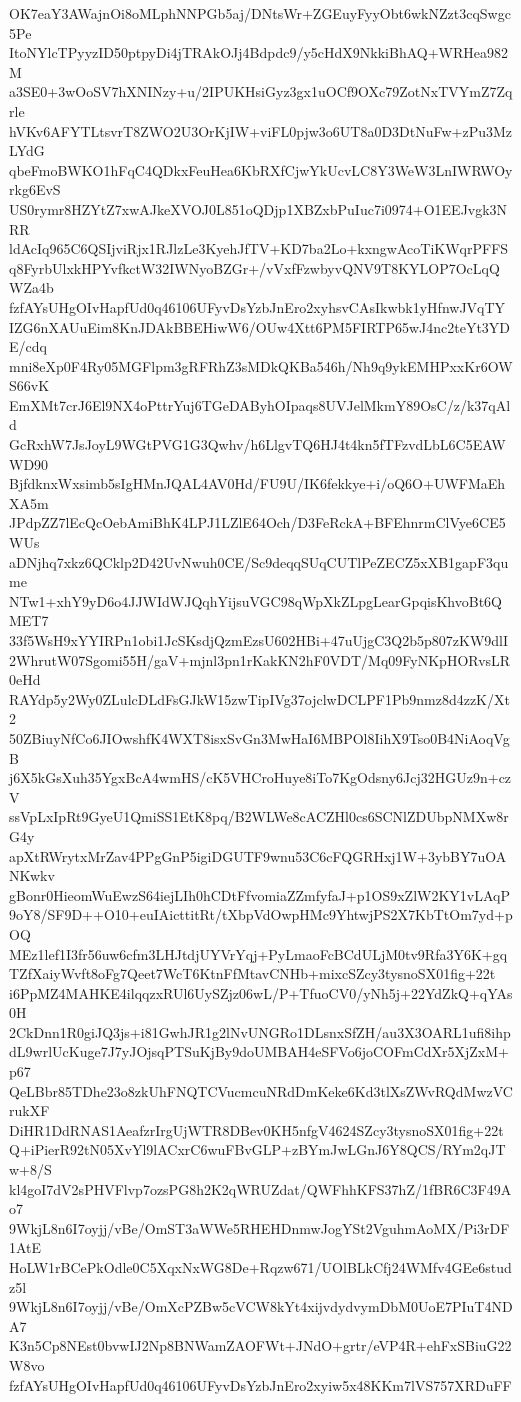 OK7eaY3AWajnOi8oMLphNNPGb5aj/DNtsWr+ZGEuyFyyObt6wkNZzt3cqSwgc5Pe
ItoNYlcTPyyzID50ptpyDi4jTRAkOJj4Bdpdc9/y5cHdX9NkkiBhAQ+WRHea982M
a3SE0+3wOoSV7hXNINzy+u/2IPUKHsiGyz3gx1uOCf9OXc79ZotNxTVYmZ7Zqrle
hVKv6AFYTLtsvrT8ZWO2U3OrKjIW+viFL0pjw3o6UT8a0D3DtNuFw+zPu3MzLYdG
qbeFmoBWKO1hFqC4QDkxFeuHea6KbRXfCjwYkUcvLC8Y3WeW3LnIWRWOyrkg6EvS
US0rymr8HZYtZ7xwAJkeXVOJ0L851oQDjp1XBZxbPuIuc7i0974+O1EEJvgk3NRR
ldAcIq965C6QSIjviRjx1RJlzLe3KyehJfTV+KD7ba2Lo+kxngwAcoTiKWqrPFFS
q8FyrbUlxkHPYvfkctW32IWNyoBZGr+/vVxfFzwbyvQNV9T8KYLOP7OcLqQWZa4b
fzfAYsUHgOIvHapfUd0q46106UFyvDsYzbJnEro2xyhsvCAsIkwbk1yHfnwJVqTY
IZG6nXAUuEim8KnJDAkBBEHiwW6/OUw4Xtt6PM5FIRTP65wJ4nc2teYt3YDE/cdq
mni8eXp0F4Ry05MGFlpm3gRFRhZ3sMDkQKBa546h/Nh9q9ykEMHPxxKr6OWS66vK
EmXMt7crJ6El9NX4oPttrYuj6TGeDAByhOIpaqs8UVJelMkmY89OsC/z/k37qAld
GcRxhW7JsJoyL9WGtPVG1G3Qwhv/h6LlgvTQ6HJ4t4kn5fTFzvdLbL6C5EAWWD90
BjfdknxWxsimb5sIgHMnJQAL4AV0Hd/FU9U/IK6fekkye+i/oQ6O+UWFMaEhXA5m
JPdpZZ7lEcQcOebAmiBhK4LPJ1LZlE64Och/D3FeRckA+BFEhnrmClVye6CE5WUs
aDNjhq7xkz6QCklp2D42UvNwuh0CE/Sc9deqqSUqCUTlPeZECZ5xXB1gapF3qume
NTw1+xhY9yD6o4JJWIdWJQqhYijsuVGC98qWpXkZLpgLearGpqisKhvoBt6QMET7
33f5WsH9xYYIRPn1obi1JcSKsdjQzmEzsU602HBi+47uUjgC3Q2b5p807zKW9dlI
2WhrutW07Sgomi55H/gaV+mjnl3pn1rKakKN2hF0VDT/Mq09FyNKpHORvsLR0eHd
RAYdp5y2Wy0ZLulcDLdFsGJkW15zwTipIVg37ojclwDCLPF1Pb9nmz8d4zzK/Xt2
50ZBiuyNfCo6JIOwshfK4WXT8isxSvGn3MwHaI6MBPOl8IihX9Tso0B4NiAoqVgB
j6X5kGsXuh35YgxBcA4wmHS/cK5VHCroHuye8iTo7KgOdsny6Jcj32HGUz9n+czV
ssVpLxIpRt9GyeU1QmiSS1EtK8pq/B2WLWe8cACZHl0cs6SCNlZDUbpNMXw8rG4y
apXtRWrytxMrZav4PPgGnP5igiDGUTF9wnu53C6cFQGRHxj1W+3ybBY7uOANKwkv
gBonr0HieomWuEwzS64iejLIh0hCDtFfvomiaZZmfyfaJ+p1OS9xZlW2KY1vLAqP
9oY8/SF9D++O10+euIAicttitRt/tXbpVdOwpHMc9YhtwjPS2X7KbTtOm7yd+pOQ
MEz1lef1I3fr56uw6cfm3LHJtdjUYVrYqj+PyLmaoFcBCdULjM0tv9Rfa3Y6K+gq
TZfXaiyWvft8oFg7Qeet7WcT6KtnFfMtavCNHb+mixcSZcy3tysnoSX01fig+22t
i6PpMZ4MAHKE4ilqqzxRUl6UySZjz06wL/P+TfuoCV0/yNh5j+22YdZkQ+qYAs0H
2CkDnn1R0giJQ3js+i81GwhJR1g2lNvUNGRo1DLsnxSfZH/au3X3OARL1ufi8ihp
dL9wrlUcKuge7J7yJOjsqPTSuKjBy9doUMBAH4eSFVo6joCOFmCdXr5XjZxM+p67
QeLBbr85TDhe23o8zkUhFNQTCVucmcuNRdDmKeke6Kd3tlXsZWvRQdMwzVCrukXF
DiHR1DdRNAS1AeafzrIrgUjWTR8DBev0KH5nfgV4624SZcy3tysnoSX01fig+22t
Q+iPierR92tN05XvYl9lACxrC6wuFBvGLP+zBYmJwLGnJ6Y8QCS/RYm2qJTw+8/S
kl4goI7dV2sPHVFlvp7ozsPG8h2K2qWRUZdat/QWFhhKFS37hZ/1fBR6C3F49Ao7
9WkjL8n6I7oyjj/vBe/OmST3aWWe5RHEHDnmwJogYSt2VguhmAoMX/Pi3rDF1AtE
HoLW1rBCePkOdle0C5XqxNxWG8De+Rqzw671/UOlBLkCfj24WMfv4GEe6studz5l
9WkjL8n6I7oyjj/vBe/OmXcPZBw5cVCW8kYt4xijvdydvymDbM0UoE7PIuT4NDA7
K3n5Cp8NEst0bvwIJ2Np8BNWamZAOFWt+JNdO+grtr/eVP4R+ehFxSBiuG22W8vo
fzfAYsUHgOIvHapfUd0q46106UFyvDsYzbJnEro2xyiw5x48KKm7lVS757XRDuFF
